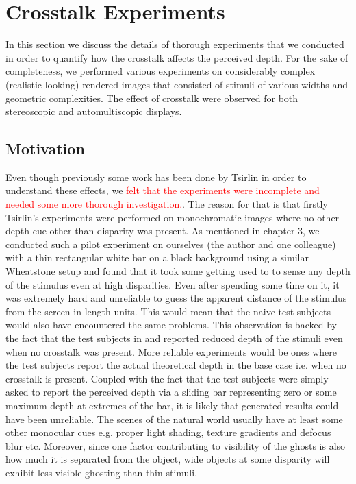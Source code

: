 \chapter{Crosstalk Experiments}
\label{chap:experiments}
In this section we discuss the details of thorough experiments that we conducted in order to quantify how the crosstalk affects the perceived depth. For the sake of completeness, we performed various experiments on considerably complex (realistic looking) rendered images that consisted of stimuli of various widths and geometric complexities. The effect of crosstalk were observed for both stereoscopic and automultiscopic displays.

\section{Motivation}
Even though previously some work has been done by Tsirlin \cite{tsirlin2011effect}\cite{tsirlin2012crosstalk}\cite{tsirlin2012effect} in order to understand these effects, we \textcolor{red}{felt that the experiments were incomplete and needed some more thorough investigation.}. The reason for that is that firstly Tsirlin's experiments were performed on monochromatic images where no other depth cue other than disparity was present. As mentioned in chapter 3, we conducted such a pilot experiment on ourselves (the author and one colleague) with a thin rectangular white bar on a black background using a similar Wheatstone setup and found that it took some getting used to to sense any depth of the stimulus even at high disparities. Even after spending some time on it, it was extremely hard and unreliable to guess the apparent distance of the stimulus from the screen in length units. This would mean that the naive test subjects would also have encountered the same problems. This observation is backed by the fact that the test subjects in \cite{tsirlin2012effect} and \cite{tsirlin2011effect} reported reduced depth of the stimuli even when no crosstalk was present. More reliable experiments would be ones where the test subjects report the actual theoretical depth in the base case i.e. when no crosstalk is present. Coupled with the fact that the test subjects were simply asked to report the perceived depth via a sliding bar representing zero or some maximum depth at extremes of the bar, it is likely that generated results could have been unreliable. The scenes of the natural world usually have at least some other monocular cues e.g. proper light shading, texture gradients and defocus blur etc. Moreover, since one factor contributing to visibility of the ghosts is also how much it is separated from the object, wide objects at some disparity will exhibit less visible ghosting than thin stimuli.

